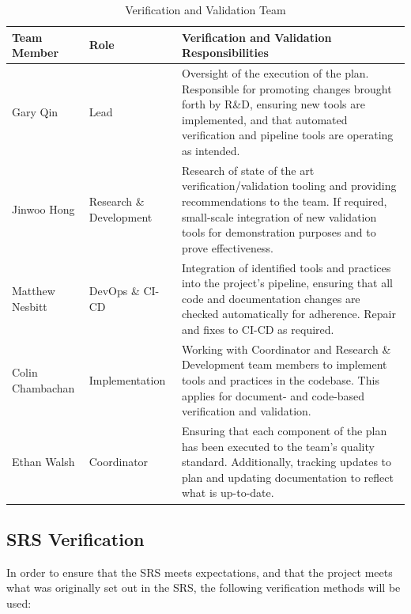 \documentclass[12pt, titlepage]{article}
\begin{document}
\begin{table}[H]
\centering
\caption{\progname{} Verification and Validation Team}
\label{tab:alternatives}
\begin{tabular}{| p{3.75cm} | p{3.75cm} | p{6.5cm} |}
\hline
\textbf{Team Member} & \textbf{Role} & \textbf{Verification and Validation Responsibilities} \\
\hline
Gary Qin & Lead & Oversight of the execution of the plan. Responsible for promoting changes brought forth by R\&D, ensuring new tools are implemented, and that automated
verification and pipeline tools are operating as intended. \\
\hline
Jinwoo Hong & Research \& Development & Research of state of the art verification/validation tooling and providing recommendations to the team.
If required, small-scale integration of new validation tools for demonstration purposes and to prove effectiveness. \\
\hline
Matthew Nesbitt & DevOps \& CI-CD & Integration of identified tools and practices into the project's pipeline, ensuring that all code and documentation changes
are checked automatically for adherence. Repair and fixes to CI-CD as required. \\
\hline
Colin Chambachan & Implementation & Working with Coordinator and Research \& Development team members to implement tools and practices in the codebase. This
applies for document- and code-based verification and validation. \\
\hline
Ethan Walsh & Coordinator & Ensuring that each component of the plan has been executed to the team's quality standard. 
Additionally, tracking updates to plan and updating documentation to reflect what is up-to-date. \\
\hline
\end{tabular}
\end{table}

\subsection{SRS Verification}
\label{sec:SRSVer}

In order to ensure that the SRS meets expectations, and that the project meets what was originally set out in the SRS,
the following verification methods will be used:
\end{document}
